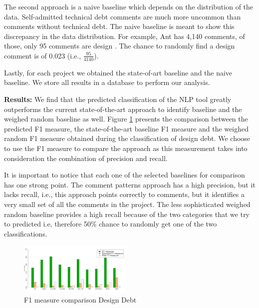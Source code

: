 The second approach is a naive baseline which depends on the distribution of the data. Self-admitted technical debt comments are much more uncommon than comments without technical debt. The naive baseline is meant to show this discrepancy in the data distribution. For example, Ant has 4,140 comments, of those, only 95 comments are design \SATD. The chance to randomly find a design \SATD comment is of 0.023 (i.e., $\frac{95}{4140}$). 

Lastly, for each project we obtained the state-of-art baseline and the naive baseline. We store all results in a database to perform our analysis. 

\vspace{1mm}

\noindent \textbf{Results:} We find that the predicted classification of the NLP tool greatly outperforms the current state-of-the-art approach to identify \SATD baseline and the weighed random baseline as well. Figure \ref{fig:f1_measure_comparison_design_debt} presents the comparison between the predicted F1 measure, the state-of-the-art baseline F1 measure and the weighed random F1 measure obtained during the classification of design debt. We choose to use the F1 measure to compare the approach as this measurement takes into consideration the combination of precision and recall.

It is important to notice that each one of the selected baselines for comparison has one strong point. The comment patterns approach has a high precision, but it lacks recall, i.e., this approach points correctly to \SATD comments, but it identifies a very small set of all the \SATD comments in the project. The less sophisticated weighed random baseline provides a high recall because of the two categories that we try to predicted i.e, therefore 50\% chance to randomly get one of the two classifications. 

\begin{figure}[thb!]
   \centering
  \includegraphics[width=0.48\textwidth]{figures/f1_measure_comparisom_design_2.pdf}
  \vspace{-3mm}
  \caption{F1 measure comparison Design Debt}
  \label{fig:f1_measure_comparison_design_debt}
\end{figure}

